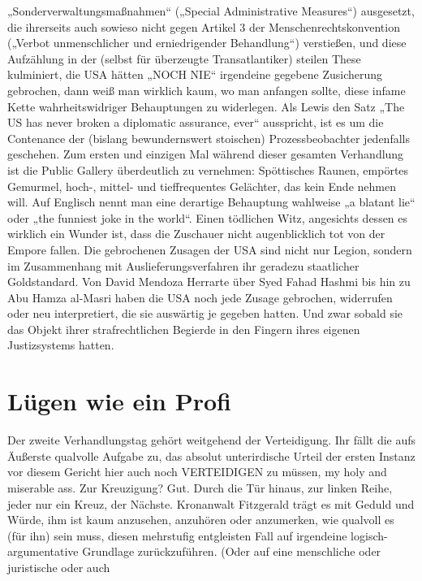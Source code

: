 \begin{multicols}{2}
„Sonderverwaltungsmaßnahmen“ („Special Administrative Measures“) ausgesetzt, die ihrerseits auch sowieso nicht gegen Artikel 3 der Menschenrechtskonvention
(„Verbot unmenschlicher und erniedrigender Behandlung“) verstießen, und diese Aufzählung in der (selbst
für überzeugte Transatlantiker) steilen These kulminiert,
die USA hätten „NOCH NIE“ irgendeine gegebene Zusicherung gebrochen, dann weiß man wirklich kaum, wo
man anfangen sollte, diese infame Kette wahrheitswidriger Behauptungen zu widerlegen.
Als Lewis den Satz „The US has never broken a diplomatic assurance, ever“ ausspricht, ist es um die Contenance der (bislang bewundernswert stoischen) Prozessbeobachter jedenfalls geschehen. Zum ersten und
einzigen Mal während dieser gesamten Verhandlung ist
die Public Gallery überdeutlich zu vernehmen: Spöttisches Raunen, empörtes Gemurmel, hoch-, mittel- und
tieffrequentes Gelächter, das kein Ende nehmen will.
Auf Englisch nennt man eine derartige Behauptung
wahlweise „a blatant lie“ oder „the funniest joke in the
world“. Einen tödlichen Witz, angesichts dessen es wirklich ein Wunder ist, dass die Zuschauer nicht augenblicklich tot von der Empore fallen. Die gebrochenen
Zusagen der USA sind nicht nur Legion, sondern im Zusammenhang mit Auslieferungsverfahren ihr geradezu
staatlicher Goldstandard. Von David Mendoza Herrarte
über Syed Fahad Hashmi bis hin zu Abu Hamza al-Masri haben die USA noch jede Zusage gebrochen, widerrufen oder neu interpretiert, die sie auswärtig je gegeben
hatten. Und zwar sobald sie das Objekt ihrer strafrechtlichen Begierde in den Fingern ihres eigenen Justizsystems hatten.




\chapter{Lügen wie ein Profi} %

Der zweite Verhandlungstag gehört weitgehend der Verteidigung. Ihr fällt die aufs Äußerste qualvolle Aufgabe
zu, das absolut unterirdische Urteil der ersten Instanz
vor diesem Gericht hier auch noch VERTEIDIGEN zu
müssen, my holy and miserable ass. Zur Kreuzigung?
Gut. Durch die Tür hinaus, zur linken Reihe, jeder nur
ein Kreuz, der Nächste. Kronanwalt Fitzgerald trägt es
mit Geduld und Würde, ihm ist kaum anzusehen, anzuhören oder anzumerken, wie qualvoll es (für ihn) sein
muss, diesen mehrstufig entgleisten Fall auf irgendeine logisch-argumentative Grundlage zurückzuführen.
(Oder auf eine menschliche oder juristische oder auch


\end{multicols}
